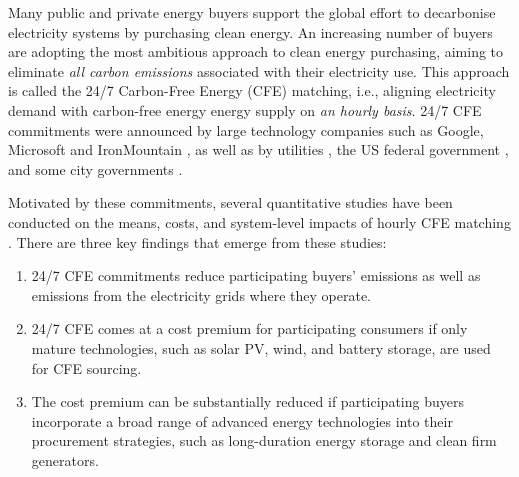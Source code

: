 \documentclass[pdflatex,sn-basic, Numbered]{sn-jnl}%
\theoremstyle{thmstyleone}%
\theoremstyle{thmstyletwo}%
\theoremstyle{thmstylethree}%
\begin{document}
Many public and private energy buyers support the global effort to decarbonise electricity systems by purchasing clean energy.
An increasing number of buyers are adopting the most ambitious approach to clean energy purchasing, aiming to eliminate \textit{all carbon emissions} associated with their electricity use.
This approach is called the 24/7 Carbon-Free Energy (CFE) matching, i.e., aligning electricity demand with carbon-free energy energy supply on \textit{an hourly basis}.
24/7 CFE commitments were announced by large technology companies such as Google, Microsoft and IronMountain \cite{google-247by2030, Microsoft-vision, IronMountainSustainability}, as well as by utilities \cite{peninsula-OurPathto247}, the US federal government \cite{thewhitehouseExecutiveOrderCatalyzing2021}, and some city governments \cite{iowaenvcouncil-247}.

Motivated by these commitments, several quantitative studies have been conducted on the means, costs, and system-level impacts of hourly CFE matching \cite{xu-247CFE-report, ieaAdvancingDecarbonisationClean2022, riepin-zenodo-systemlevel247, riepinMeansCostsSystemlevel2024}. There are three key findings that emerge from these studies:
\begin{enumerate}
    \item 24/7 CFE commitments reduce participating buyers' emissions as well as emissions from the electricity grids where they operate.
    \item 24/7 CFE comes at a cost premium for participating consumers if only mature technologies, such as solar PV, wind, and battery storage, are used for CFE sourcing.
    \item The cost premium can be substantially reduced if participating buyers incorporate a broad range of advanced energy technologies into their procurement strategies, such as long-duration energy storage and clean firm generators.
\end{enumerate}
\end{document}
